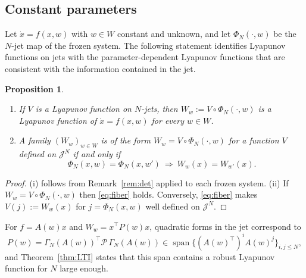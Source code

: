 \documentclass[preprint,12pt,authoryear]{elsarticle}
\newtheorem{proposition}[theorem]{Proposition}
\theoremstyle{definition}
\theoremstyle{remark}
\newcommand{\Jet}{\mathcal{J}}
\newcommand{\tr}{^{\top}}
\newcommand{\PP}{\mathcal{P}}
\DeclareMathOperator{\spn}{span}
\begin{document}
\subsection{Constant parameters}
Let $\dot x=f(x,w)$ with $w\in W$ constant and unknown, and let $\Phi_N(\cdot,w)$ be the $N$-jet map of the frozen system. The following statement identifies Lyapunov functions on jets with the parameter-dependent Lyapunov functions that are consistent with the information contained in the jet.
\begin{proposition}\label{prop:PDLF}
\begin{enumerate}[nosep,label=(\roman*)]
\item If $V$ is a Lyapunov function on $N$-jets, then $W_w:=V\circ\Phi_N(\cdot,w)$ is a Lyapunov function of $\dot x=f(x,w)$ for every $w\in W$.
\item A family $(W_w)_{w\in W}$ is of the form $W_w=V\circ\Phi_N(\cdot,w)$ for a function $V$ defined on $\Jet^N$ if and only if
\begin{equation}\label{eq:fiber}
\Phi_N(x,w)=\Phi_N(x,w')\ \Longrightarrow\ W_w(x)=W_{w'}(x).
\end{equation}
\end{enumerate}
\end{proposition}
\begin{proof}
(i) follows from Remark~\ref{rem:det} applied to each frozen system. (ii) If $W_w=V\circ\Phi_N(\cdot,w)$ then \eqref{eq:fiber} holds. Conversely, \eqref{eq:fiber} makes $V(j):=W_w(x)$ for $j=\Phi_N(x,w)$ well defined on $\Jet^N$.
\end{proof}
For $f=A(w)x$ and $W_w=x\tr P(w)x$, quadratic forms in the jet correspond to
\begin{equation}\label{eq:Pw}
P(w)=\Gamma_N(A(w))\tr\PP\,\Gamma_N(A(w))\in\spn\big\{(A(w)\tr)^iA(w)^j\big\}_{i,j\le N},
\end{equation}
and Theorem~\ref{thm:LTI} states that this span contains a robust Lyapunov function for $N$ large enough.
\end{document}
